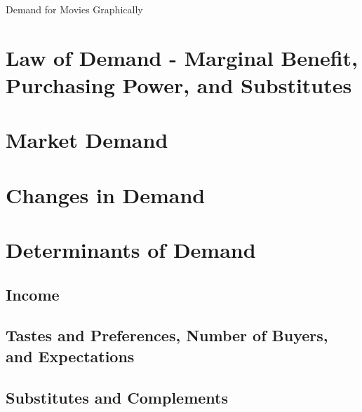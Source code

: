 \documentclass{beamer}
\begin{document}
\begin{frame}{Demand for Movies Graphically}
\end{frame}

\section{Law of Demand - Marginal Benefit, Purchasing Power, and Substitutes}

\begin{frame}

\end{frame}

\section{Market Demand}

\begin{frame}

\end{frame}

\section{Changes in Demand}

\begin{frame}

\end{frame}

\section{Determinants of Demand}

\subsection{Income}

\begin{frame}

\end{frame}

\subsection{Tastes and Preferences, Number of
Buyers, and Expectations}

\begin{frame}

\end{frame}

\subsection{Substitutes and Complements}

\begin{frame}

\end{frame}

\end{document}
